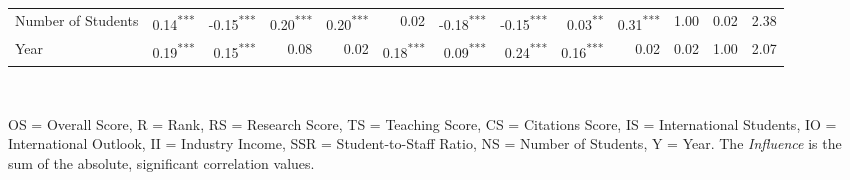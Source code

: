 \documentclass[conference]{IEEEtran}
\begin{document}
\begin{table*}[h!]
\begin{tabular}{|l|r|r|r|r|r|r|r|r|r|r|r|r|}
		Number of Students & \cellcolor{gray!07}0.14\textsuperscript{***} & \cellcolor{gray!08}-0.15\textsuperscript{***} & \cellcolor{gray!10}0.20\textsuperscript{***} & \cellcolor{gray!10}0.20\textsuperscript{***} & \cellcolor{gray!01}0.02 & \cellcolor{gray!09}-0.18\textsuperscript{***} & \cellcolor{gray!08}-0.15\textsuperscript{***} & \cellcolor{gray!02}0.03\textsuperscript{**} & \cellcolor{gray!16}0.31\textsuperscript{***} & \cellcolor{gray!50}1.00 & \cellcolor{gray!01}0.02 & 2.38 \\
		
		Year & \cellcolor{gray!09}0.19\textsuperscript{***} & \cellcolor{gray!08}0.15\textsuperscript{***} & \cellcolor{gray!04}0.08 & \cellcolor{gray!01}0.02 & \cellcolor{gray!09}0.18\textsuperscript{***} & \cellcolor{gray!05}0.09\textsuperscript{***} & \cellcolor{gray!12}0.24\textsuperscript{***} & \cellcolor{gray!08}0.16\textsuperscript{***} & \cellcolor{gray!01}0.02 & \cellcolor{gray!01}0.02 & \cellcolor{gray!50}1.00 & 2.07 \\
		
		
		
		\hline
	\end{tabular}
	\\
	\vspace{1mm} \scriptsize \raggedright OS = Overall Score, R = Rank, RS = Research Score, TS = Teaching Score, CS = Citations Score, IS = International Students, IO = International Outlook, II = Industry Income, SSR = Student-to-Staff Ratio, NS = Number of Students, Y = Year. The \textit{Influence} is the sum of the absolute, significant correlation values.
\end{table*}
\end{document}
